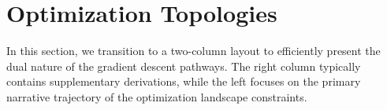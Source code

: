 \documentclass{article}
\begin{document}
\twocolumn
\section{Optimization Topologies}
In this section, we transition to a two-column layout to efficiently present the dual nature of the gradient descent pathways. 
The right column typically contains supplementary derivations, while the left focuses on the primary narrative trajectory of the optimization landscape constraints.
\end{document}
